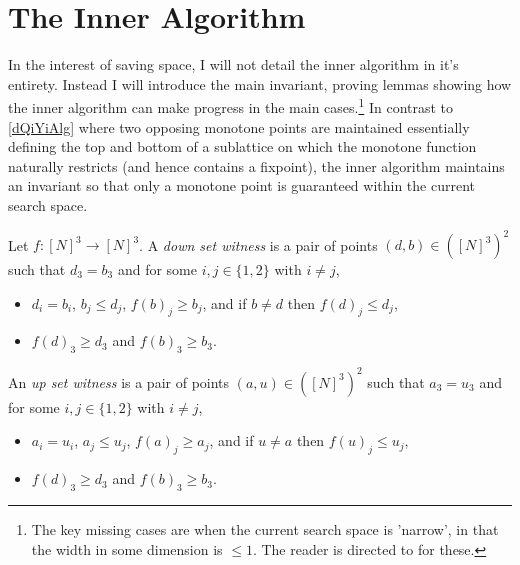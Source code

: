 \section{The Inner Algorithm}
In the interest of saving space, I will not detail the inner algorithm in it's entirety.
Instead I will introduce
the main invariant, proving lemmas showing how the inner algorithm
can make progress in the main cases.\footnote{The key missing cases are when the current search space is 'narrow',
in that the width in some dimension is $\leq 1$.
The reader is directed to \citep{fasterTarski} for these.} In contrast to
\cref{dQiYiAlg} where two opposing monotone points are maintained essentially
defining the top and bottom of a sublattice on which the monotone function
naturally restricts (and hence contains a fixpoint), 
the inner algorithm maintains an invariant so that only a monotone point is guaranteed
within the current search space.
\begin{definition} \label{witnessDef}
  Let $f : [N]^3 \to [N]^3$. A \emph{down set witness} is a pair of points
  $(d, b) \in ([N]^3)^2$ such that $d_3 = b_3$ and for some $i, j \in \{1, 2\}$
  with $i \neq j$,
  \begin{itemize}
    \item $d_i = b_i$, $b_j \leq d_j$, $f(b)_j \geq b_j$, and if $b \neq d$ then $f(d)_j \leq d_j$,
    \item $f(d)_3 \geq d_3$ and $f(b)_3 \geq b_3$.
  \end{itemize}
  An \emph{up set witness} is a pair of points
  $(a, u) \in ([N]^3)^2$ such that $a_3 = u_3$ and for some $i, j \in \{1, 2\}$
  with $i \neq j$,
  \begin{itemize}
    \item $a_i = u_i$, $a_j \leq u_j$, $f(a)_j \geq a_j$, and if $u \neq a$ then $f(u)_j \leq u_j$,
    \item $f(d)_3 \geq d_3$ and $f(b)_3 \geq b_3$.
  \end{itemize}
\end{definition}

